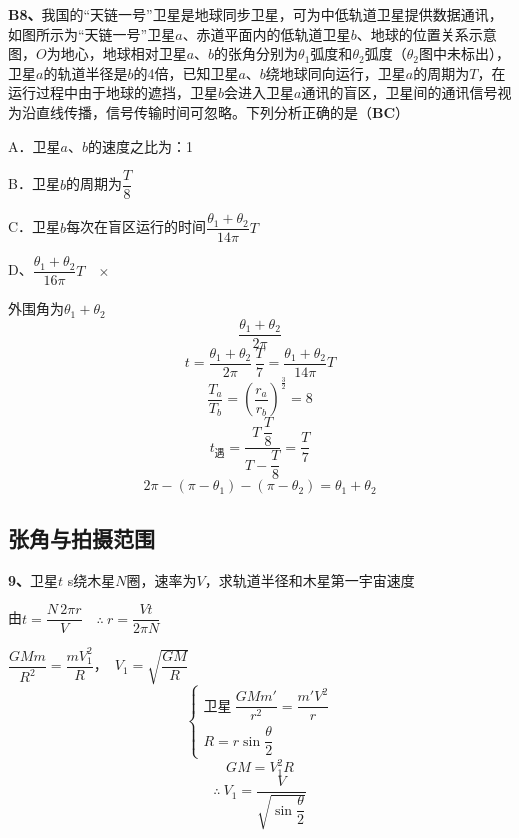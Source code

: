 \begin{problem}[B8]
\textbf{B8、}我国的“天链一号”卫星是地球同步卫星，可为中低轨道卫星提供数据通讯，如图所示为“天链一号”卫星$a$、赤道平面内的低轨道卫星$b$、地球的位置关系示意图，$O$为地心，地球相对卫星$a$、$b$的张角分别为$\theta_1$弧度和$\theta_2$弧度（$\theta_2$图中未标出），卫星$a$的轨道半径是$b$的4倍，已知卫星$a$、$b$绕地球同向运行，卫星$a$的周期为$T$，在运行过程中由于地球的遮挡，卫星$b$会进入卫星$a$通讯的盲区，卫星间的通讯信号视为沿直线传播，信号传输时间可忽略。下列分析正确的是（\textbf{BC}）

\noindent A．卫星$a$、$b$的速度之比为：1%

\noindent B．卫星$b$的周期为$\dfrac{T}{8}$%

\noindent C．卫星$b$每次在盲区运行的时间$\dfrac{\theta_1+\theta_2}{14\pi}T$%

\noindent D、$\dfrac{\theta_1+\theta_2}{16\pi}T$　$\times$%
\begin{solution}
外围角为$\theta_1+\theta_2$
\[ \dfrac{\theta_1+\theta_2}{2\pi} \]
\[ t=\dfrac{\theta_1+\theta_2}{2\pi}\,\dfrac{T}{7}=\dfrac{\theta_1+\theta_2}{14\pi}T \]
\[ \dfrac{T_a}{T_b}=\left(\dfrac{r_a}{r_b}\right)^{\frac{3}{2}}=8 \]
\[ t_{\text{遇}}=\dfrac{T\,\dfrac{T}{8}}{T-\dfrac{T}{8}}=\dfrac{T}{7} \]
\[ 2\pi-(\pi-\theta_1)-(\pi-\theta_2)=\theta_1+\theta_2 \]
\end{solution}
\end{problem}

\subsection{张角与拍摄范围}
\begin{problem}[9]
\textbf{9、}卫星$t$ s绕木星$N$圈，速率为$V$，求轨道半径和木星第一宇宙速度
\begin{solution}
由$t=\dfrac{N\,2\pi r}{V}$　$\therefore\ r=\dfrac{Vt}{2\pi N}$

$\dfrac{GMm}{R^2}=\dfrac{mV_1^2}{R}$，　$V_1=\sqrt{\dfrac{GM}{R}}$
\[ \begin{cases}
\text{卫星}\ \dfrac{GMm'}{r^2}=\dfrac{m'V^2}{r}\\[4pt]
R=r\sin\dfrac{\theta}{2}
\end{cases} \]
\[ GM=V_1^2R \]
\[ \therefore\ V_1=\dfrac{V}{\sqrt{\sin\dfrac{\theta}{2}}} \]
\end{solution}
\end{problem}

